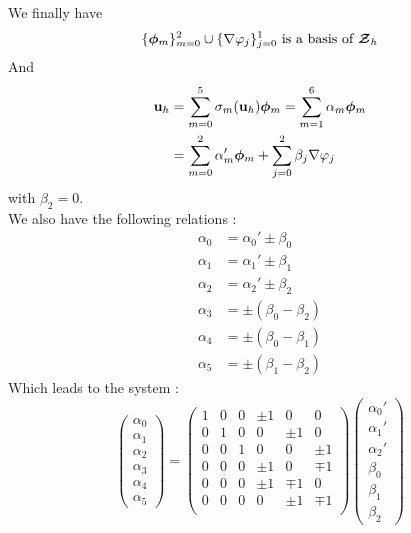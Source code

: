 We finally have \[ \{\bm{\phi}_m\}_{m=0}^2\cup\{{\nabla}\varphi_j\}_{j=0}^1
\mbox{ is a basis of } {\bm{\mathcal{Z}}}_h \]
And
\begin{align*}
{\mathbf{u}}_h &= \sum_{m=0}^5 \sigma_m({\mathbf{u}}_h) \bm{\phi}_m = \sum_{m=1}^6 \alpha_m \bm{\phi}_m\\
&= \sum_{m=0}^2 \alpha_m'\bm{\phi}_m + \sum_{j=0}^2 \beta_j{\nabla}\varphi_j
\end{align*}
with $\beta_2 = 0$.\\

We also have the following relations :
\begin{align*}
\alpha_0 &= \alpha_0' \pm \beta_0\\
\alpha_1 &= \alpha_1' \pm \beta_1\\
\alpha_2 &= \alpha_2' \pm \beta_2\\
\alpha_3 &= \pm(\beta_0-\beta_2)\\
\alpha_4 &= \pm(\beta_0-\beta_1)\\
\alpha_5 &= \pm(\beta_1-\beta_2)
\end{align*}
Which leads to the system :
\[ \begin{pmatrix}
\alpha_0\\\alpha_1\\\alpha_2\\\alpha_3\\\alpha_4\\\alpha_5
\end{pmatrix} = \begin{pmatrix}
1 & 0 & 0 & \pm 1 & 0 & 0\\
0 & 1 & 0 & 0 & \pm 1 & 0\\
0 & 0 & 1 & 0 & 0 & \pm 1\\
0 & 0 & 0 & \pm 1 & 0 & \mp 1\\
0 & 0 & 0 & \pm 1 & \mp 1 & 0\\
0 & 0 & 0 & 0 & \pm 1 & \mp 1\\
\end{pmatrix} \begin{pmatrix}
\alpha_0'\\\alpha_1'\\\alpha_2'\\\beta_0\\\beta_1\\\beta_2
\end{pmatrix} \]


